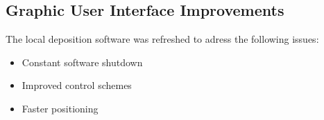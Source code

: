


\subsection{Graphic User Interface Improvements}

The local deposition software was refreshed to adress the following issues:

\begin{itemize}
\item Constant software shutdown
\item Improved control schemes
\item Faster positioning
\end{itemize}

